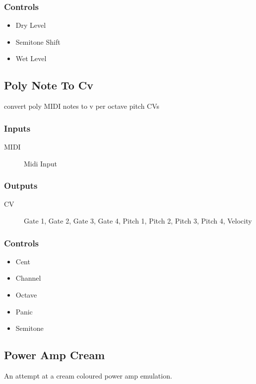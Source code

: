 \subsubsection{Controls}
\begin{itemize}
\item Dry Level
\item Semitone Shift
\item Wet Level
\end{itemize}

\subsection{Poly Note To Cv}

convert poly MIDI notes to v per octave pitch CVs



\subsubsection{Inputs}
\begin{description}
\item [MIDI] Midi Input
\end{description}

\subsubsection{Outputs}
\begin{description}
\item [CV] Gate 1, Gate 2, Gate 3, Gate 4, Pitch 1, Pitch 2, Pitch 3, Pitch 4, Velocity
\end{description}

\subsubsection{Controls}
\begin{itemize}
\item Cent
\item Channel
\item Octave
\item Panic
\item Semitone
\end{itemize}

\subsection{Power Amp Cream}

An attempt at a cream coloured power amp emulation.




